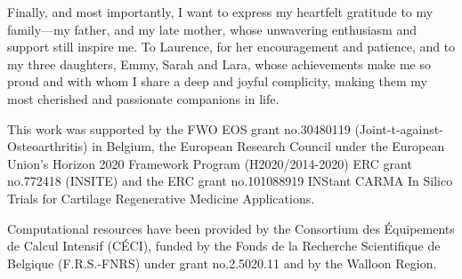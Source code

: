 Finally, and most importantly, I want to express my heartfelt gratitude to my family—my father, and my late mother, whose unwavering enthusiasm and support still inspire me. To Laurence, for her encouragement and patience, and to my three daughters, Emmy, Sarah and Lara, whose achievements make me so proud and with whom I share a deep and joyful complicity, making them my most cherished and passionate companions in life.

This work was supported by the FWO EOS grant no.30480119 (Joint-t-against-Osteoarthritis) in Belgium, the European Research Council under the European Union's Horizon 2020 Framework Program (H2020/2014-2020) ERC grant no.772418 (INSITE) and the ERC grant no.101088919 INStant CARMA In Silico Trials for Cartilage Regenerative Medicine Applications.

Computational resources have been provided by the Consortium des Équipements de Calcul Intensif (CÉCI), funded by the Fonds de la Recherche Scientifique de Belgique (F.R.S.-FNRS) under grant no.2.5020.11 and by the Walloon Region.



\cleardoublepage

